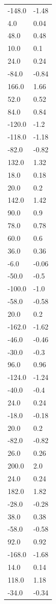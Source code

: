 \begin{longtable}{ll}
-148.0 & -1.48 \\
4.0 & 0.04 \\
48.0 & 0.48 \\
10.0 & 0.1 \\
24.0 & 0.24 \\
-84.0 & -0.84 \\
166.0 & 1.66 \\
52.0 & 0.52 \\
84.0 & 0.84 \\
-120.0 & -1.2 \\
-118.0 & -1.18 \\
-82.0 & -0.82 \\
132.0 & 1.32 \\
18.0 & 0.18 \\
20.0 & 0.2 \\
142.0 & 1.42 \\
90.0 & 0.9 \\
78.0 & 0.78 \\
60.0 & 0.6 \\
36.0 & 0.36 \\
-6.0 & -0.06 \\
-50.0 & -0.5 \\
-100.0 & -1.0 \\
-58.0 & -0.58 \\
20.0 & 0.2 \\
-162.0 & -1.62 \\
-46.0 & -0.46 \\
-30.0 & -0.3 \\
96.0 & 0.96 \\
-124.0 & -1.24 \\
-40.0 & -0.4 \\
24.0 & 0.24 \\
-18.0 & -0.18 \\
20.0 & 0.2 \\
-82.0 & -0.82 \\
26.0 & 0.26 \\
200.0 & 2.0 \\
24.0 & 0.24 \\
182.0 & 1.82 \\
-28.0 & -0.28 \\
38.0 & 0.38 \\
-58.0 & -0.58 \\
92.0 & 0.92 \\
-168.0 & -1.68 \\
14.0 & 0.14 \\
118.0 & 1.18 \\
-34.0 & -0.34 \\

\end{longtable}
